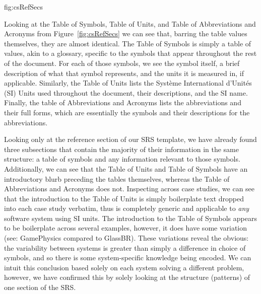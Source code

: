 {fig:csRefSecs}

Looking at the Table of Symbols, Table of Units, and Table of Abbreviations and 
Acronyms from Figure~\ref{fig:csRefSecs} we can see that, barring the table 
values themselves, they are almost identical. The Table of Symbols is simply a 
table of values, akin to a glossary, specific to the symbols that 
appear throughout the rest of the document. For each of those symbols, we see 
the symbol itself, a brief description of what that symbol represents, and the 
units it is measured in, if applicable. Similarly, the Table of Units lists the
Syst\`eme International d'Unit\'es (SI) Units used throughout the document, 
their descriptions, and the SI name. Finally, the table of Abbreviations and 
Acronyms lists the abbreviations and their full forms, which are 
essentially the symbols and their descriptions for the abbreviations.

Looking only at the reference section of our SRS template, we have already found
three subsections that contain the majority of their information in the same
structure: a table of symbols and any information relevant to those symbols.
Additionally, we can see that the Table of Units and Table of Symbols have an
introductory blurb preceding the tables themselves, whereas the Table of 
Abbreviations and Acronyms does not. Inspecting across case studies, we can see
that the introduction to the Table of Units is simply boilerplate text 
dropped into each case study verbatim, thus is completely generic and 
applicable to \emph{any} software system using SI units. The introduction to 
the Table of Symbols appears to be boilerplate across several examples, 
however, it does have some variation (see: GamePhysics compared to GlassBR).
These variations reveal the obvious: the variability between systems is greater 
than simply a difference in choice of symbols, and so there is some 
system-specific knowledge being encoded. We can intuit this conclusion based 
solely on each system solving a different problem, however, we have confirmed 
this by solely looking at the structure (patterns) of one section of the SRS.

